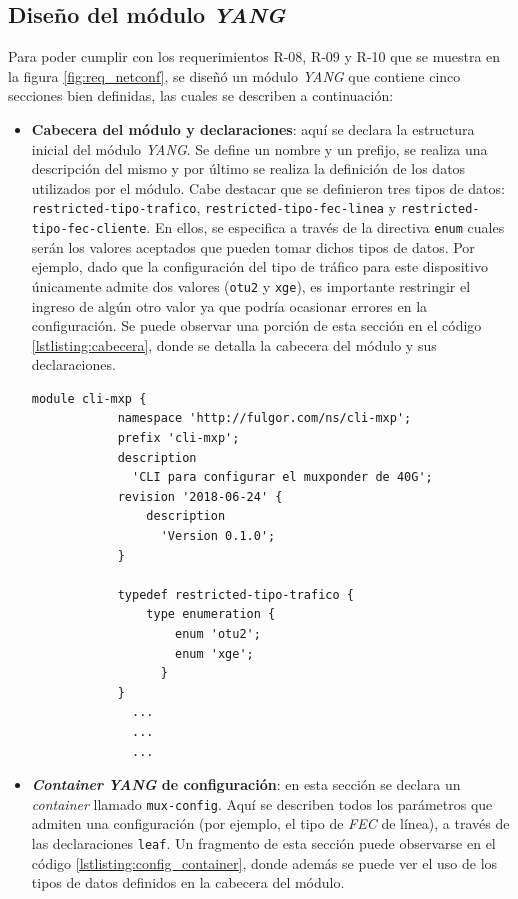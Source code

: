 \subsection{Diseño del módulo \textit{YANG}}

Para poder cumplir con los requerimientos R-08, R-09 y R-10 que se muestra en la figura \ref{fig:req_netconf}, se diseñó un módulo \textit{YANG} que contiene cinco secciones bien definidas, las cuales se describen a continuación: 

\begin{itemize}
	\item \textbf{Cabecera del módulo y declaraciones}: aquí se declara la estructura inicial del módulo \textit{YANG}. Se define un nombre y un prefijo, se realiza una descripción del mismo y por último se realiza la definición de los datos utilizados por el módulo. Cabe destacar que se definieron tres tipos de datos: \texttt{restricted-tipo-trafico}, \texttt{restricted-tipo-fec-linea} y \texttt{restricted-tipo-fec-cliente}. En ellos, se especifica a través de la directiva \texttt{enum} cuales serán los valores aceptados que pueden tomar dichos tipos de datos. Por ejemplo, dado que la configuración del tipo de tráfico para este dispositivo únicamente admite dos valores (\texttt{otu2} y \texttt{xge}), es importante restringir el ingreso de algún otro valor ya que podría ocasionar errores en la configuración. Se puede observar una porción de esta sección en el código \ref{lstlisting:cabecera}, donde se detalla la cabecera del módulo y sus declaraciones.  

    \begin{lstlisting}[language=SHELXL, caption=Cabecera del módulo \textit{YANG}., label=lstlisting:cabecera]
        module cli-mxp {
            namespace 'http://fulgor.com/ns/cli-mxp';
            prefix 'cli-mxp';
            description
              'CLI para configurar el muxponder de 40G';
            revision '2018-06-24' {
                description
                  'Version 0.1.0';
            }

            typedef restricted-tipo-trafico {
                type enumeration {
                    enum 'otu2';
                    enum 'xge';
                  }
            }
              ...
              ...
              ...

    \end{lstlisting}

    \item \textbf{\textit{Container} \textit{YANG} de configuración}: en esta sección se declara un \textit{container} llamado \texttt{mux-config}. Aquí se describen todos los parámetros que admiten una configuración (por ejemplo, el tipo de \textit{FEC} de línea), a través de las declaraciones \texttt{leaf}. Un fragmento de esta sección puede observarse en el código \ref{lstlisting:config_container}, donde además se puede ver el uso de los tipos de datos definidos en la cabecera del módulo.
  

\end{itemize}
